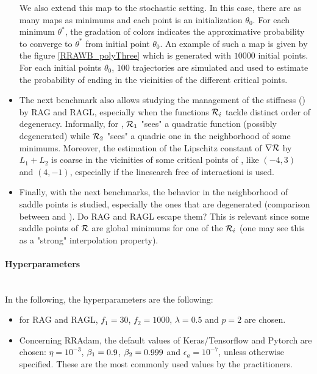 \begin{itemize}
	We also extend this map to the stochastic setting. In this case, there are as many maps as minimums and each point is an initialization $\theta_0$. For each minimum
        $\theta^*$, the gradation of colors indicates the approximative probability to converge to $\theta^*$ from initial point $\theta_0$. An example of such a map is given by
        the figure \ref{RRAWB_polyThree} which is generated with $10000$ initial points.  For each initial points $\theta_0$, $100$ trajectories are simulated and used to estimate
        the probability of ending in the vicinities of the different critical points.
	\item The next benchmark also allows studying the management of the stiffness (\polyFive) by RAG and RAGL, especially when the functions $\mathcal{R}_i$ tackle distinct order of
          degeneracy. Informally, for \polyFive, $\mathcal{R}_1$ "sees" a quadratic function (possibly degenerated) while $\mathcal{R}_2$ "sees" a quadric one in the neighborhood of some minimums.
          Moreover, the estimation of the Lipschitz constant of $\nabla \mathcal{R}$ by $L_1+L_2$ is coarse in the vicinities of some critical points of \polyFive, like $(-4,3)$ and $(4,-1)$,
          especially if the linesearch free of interactioni is used. 
	\item Finally, with the next benchmarks, the behavior in the neighborhood of saddle points is studied, especially the ones that are degenerated (comparison between \polyThree and \polyFive). Do RAG and RAGL escape them? This is relevant since some saddle points of $\mathcal{R}$ are global minimums for one of the $\mathcal{R}_i$ (one may see this as a "strong" interpolation property).
\end{itemize}

\paragraph{Hyperparameters}
~~\\
In the following, the hyperparameters are the following:
\begin{itemize}
	\item for RAG and RAGL, $f_1=30$, $f_2=1000$, $\lambda=0.5$ and $p=2$ are chosen. 
	\item Concerning RRAdam, the default values of Keras/Tensorflow and Pytorch are chosen: $\eta=10^{-3}$, $\beta_1=0.9$, $\beta_2=0.999$ and $\epsilon_a=10^{-7}$, unless
          otherwise specified. These are the most commonly used values by the practitioners.
\end{itemize}

